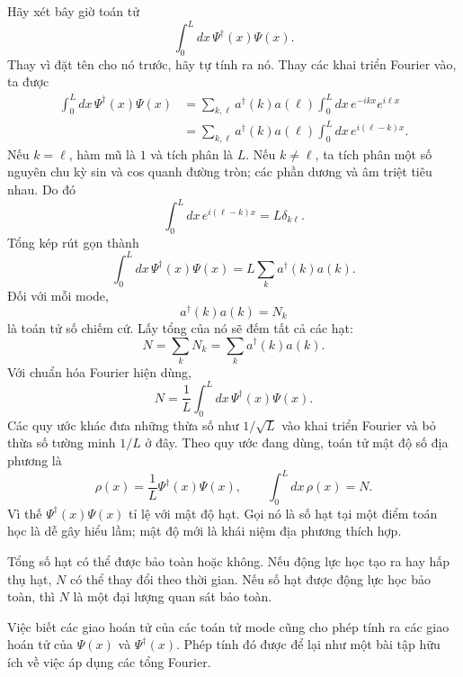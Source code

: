 Hãy xét bây giờ toán tử
\begin{equation}
\int_0^L dx\,\Psi^\dagger(x)\Psi(x).
\end{equation}
Thay vì đặt tên cho nó trước, hãy tự tính ra nó. Thay các khai triển Fourier vào, ta được
\begin{align}
\int_0^L dx\,\Psi^\dagger(x)\Psi(x)
&=
\sum_{k,\ell}a^\dagger(k)a(\ell)
\int_0^L dx\,e^{-ikx}e^{i\ell x}
\\
&=
\sum_{k,\ell}a^\dagger(k)a(\ell)
\int_0^L dx\,e^{i(\ell-k)x}.
\end{align}
Nếu \(k=\ell\), hàm mũ là \(1\) và tích phân là \(L\). Nếu \(k\ne\ell\), ta tích phân một số nguyên chu kỳ sin và cos quanh đường tròn; các phần dương và âm triệt tiêu nhau. Do đó
\begin{equation}
\int_0^L dx\,e^{i(\ell-k)x}=L\delta_{k\ell}.
\end{equation}
Tổng kép rút gọn thành
\begin{equation}
\int_0^L dx\,\Psi^\dagger(x)\Psi(x)
=L\sum_k a^\dagger(k)a(k).
\end{equation}
Đối với mỗi mode,
\begin{equation}
a^\dagger(k)a(k)=N_k
\end{equation}
là toán tử số chiếm cứ. Lấy tổng của nó sẽ đếm tất cả các hạt:
\begin{equation}
N=\sum_k N_k=\sum_k a^\dagger(k)a(k).
\end{equation}
Với chuẩn hóa Fourier hiện dùng,
\begin{equation}
N=\frac{1}{L}\int_0^L dx\,
\Psi^\dagger(x)\Psi(x).
\end{equation}
Các quy ước khác đưa những thừa số như \(1/\sqrt{L}\) vào khai triển Fourier và bỏ thừa số tường minh \(1/L\) ở đây. Theo quy ước đang dùng, toán tử mật độ số địa phương là
\begin{equation}
\rho(x)=\frac{1}{L}\Psi^\dagger(x)\Psi(x),
\qquad
\int_0^L dx\,\rho(x)=N.
\end{equation}
Vì thế \(\Psi^\dagger(x)\Psi(x)\) tỉ lệ với mật độ hạt. Gọi nó là số hạt tại một điểm toán học là dễ gây hiểu lầm; mật độ mới là khái niệm địa phương thích hợp.

Tổng số hạt có thể được bảo toàn hoặc không. Nếu động lực học tạo ra hay hấp thụ hạt, \(N\) có thể thay đổi theo thời gian. Nếu số hạt được động lực học bảo toàn, thì \(N\) là một đại lượng quan sát bảo toàn.

Việc biết các giao hoán tử của các toán tử mode cũng cho phép tính ra các giao hoán tử của \(\Psi(x)\) và \(\Psi^\dagger(x)\). Phép tính đó được để lại như một bài tập hữu ích về việc áp dụng các tổng Fourier.

